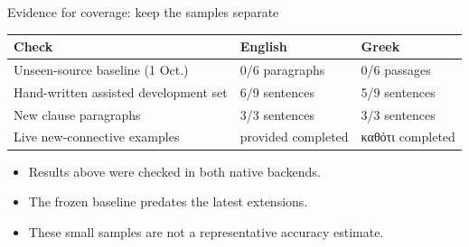 \documentclass[aspectratio=169,11pt]{beamer}
\begin{document}
\begin{frame}{Evidence for coverage: keep the samples separate}
  \color{Ink}
  \small
  \begin{tabularx}{\textwidth}{@{}p{56mm}YY@{}}\toprule
    \textbf{Check} & \textbf{English} & \textbf{Greek}\\\midrule
    Unseen-source baseline (1 Oct.) & 0/6 paragraphs & 0/6 passages\\[5pt]
    Hand-written assisted development set & 6/9 sentences & 5/9 sentences\\[5pt]
    New clause paragraphs & 3/3 sentences & 3/3 sentences\\[5pt]
    Live new-connective examples & provided completed & καθότι completed\\\bottomrule
  \end{tabularx}\par
  \vspace{4mm}
  \normalsize\begin{itemize}\setlength\itemsep{5pt}
    \item Results above were checked in both native backends.
    \item The frozen baseline predates the latest extensions.
    \item These small samples are not a representative accuracy estimate.
  \end{itemize}
\end{frame}
\end{document}
